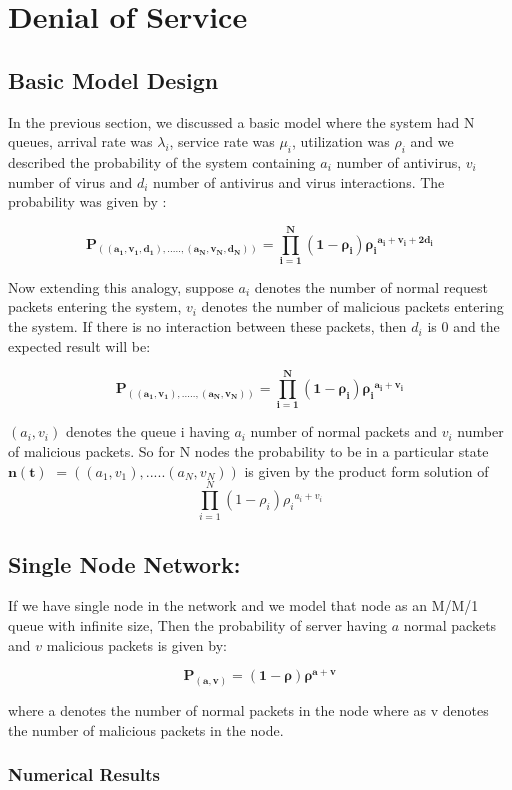 \chapter{Denial of Service}

\section{Basic Model Design}

In the previous section, we discussed a basic model where the system had N queues, arrival rate was $\lambda_i$, service rate was $\mu_i$, utilization was $\rho_i$ and we described the probability of the system containing $a_i$ number of antivirus, $v_i$ number of virus and $d_i$ number of antivirus and virus interactions. The probability was given by :

$$\mathbf{P_{((a_1,v_1,d_1),.....,(a_N,v_N,d_N))} =      \prod_{i=1}^{N} (1-\rho_i){{\rho_i}^{a_i+v_i+2d_i}} }$$

Now extending this analogy, suppose $a_i$ denotes the number of normal request packets entering the system, $v_i$ denotes the number of malicious packets entering the system. If there is no interaction between these packets, then $d_i$ is 0 and the expected result will be:

$$\mathbf{P_{((a_1,v_1),.....,(a_N,v_N))} = \prod_{i=1}^{N} (1-\rho_i){{\rho_i}^{a_i+v_i}} }$$

$(a_i,v_i)$ denotes the queue i having $a_i$ number of normal packets and $v_i$ number of malicious packets. So for N nodes the probability to be in a particular state $\mathbf{n(t)}$ $=((a_1,v_1),.....(a_N,v_N))$ is given by the product form solution of $$\prod_{i=1}^{N} (1-\rho_i){{\rho_i}^{a_i+v_i}} $$

\section{Single Node Network:} 

If we have single node in the network and we model that node as an M/M/1 queue with infinite size, Then the probability of server  having $a$ normal packets and $v$ malicious packets is given by: 

$$\mathbf{P_{(a,v)} =(1-\rho){{\rho}^{a+v}} }$$

where a denotes the number of normal packets in the node where as v denotes the number of malicious packets in the node.

\subsection{Numerical Results}

